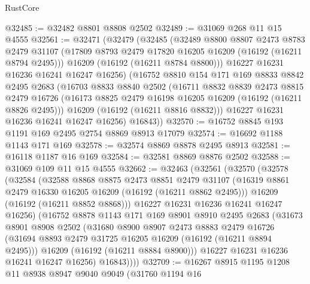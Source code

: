 \begin{lexlean}{RustCore}
\begin{coremodule}
@32485 := @32482 @8801 @8808 @2502
@32489 := @31069 @268 @11 @15 @4555
@32561 := @32471
    (@32479
      (@32485
        (@32489
          @8800
          @8807
          @2473
          @8783
          @2479
          @31107
          (@17809 @8793 @2479 @17820 @16205 @16209 (@16192 (@16211 @8794 @2495)))
          @16209
          (@16192 (@16211 @8784 @8800)))
        @16227
        @16231
        @16236
        @16241
        @16247
        @16256)
      (@16752
        @8810
        @154
        @171
        @169
        @8833
        @8842
        @2495
        @2683
        (@16703
          @8833
          @8840
          @2502
          (@16711
            @8832
            @8839
            @2473
            @8815
            @2479
            @16726
            (@16173 @8825 @2479 @16198 @16205 @16209 (@16192 (@16211 @8826 @2495)))
            @16209
            (@16192 (@16211 @8816 @8832)))
          @16227
          @16231
          @16236
          @16241
          @16247
          @16256)
        @16843))
@32570 := @16752 @8845 @193 @1191 @169 @2495 @2754 @8869 @8913 @17079
@32574 := @16692 @1188 @1143 @171 @169
@32578 := @32574 @8869 @8878 @2495 @8913
@32581 := @16118 @1187 @16 @169
@32584 := @32581 @8869 @8876 @2502
@32588 := @31069 @109 @11 @15 @4555
@32662 := @32463
    (@32561
      (@32570
        (@32578
          (@32584
            (@32588
              @8868
              @8875
              @2473
              @8851
              @2479
              @31107
              (@16319 @8861 @2479 @16330 @16205 @16209 (@16192 (@16211 @8862 @2495)))
              @16209
              (@16192 (@16211 @8852 @8868)))
            @16227
            @16231
            @16236
            @16241
            @16247
            @16256)
          (@16752
            @8878
            @1143
            @171
            @169
            @8901
            @8910
            @2495
            @2683
            (@31673
              @8901
              @8908
              @2502
              (@31680
                @8900
                @8907
                @2473
                @8883
                @2479
                @16726
                (@31694 @8893 @2479 @31725 @16205 @16209 (@16192 (@16211 @8894 @2495)))
                @16209
                (@16192 (@16211 @8884 @8900)))
              @16227
              @16231
              @16236
              @16241
              @16247
              @16256)
            @16843))))
@32709 := @16267
    @8915
    @1195
    @1208
    @11
    @8938
    @8947
    @9040
    @9049
    (@31760
      @1194
      @16

\end{coremodule}
\end{lexlean}
